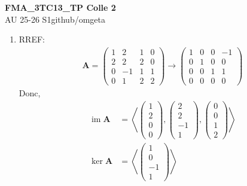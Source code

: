 \documentclass[12pt, a4paper]{article}
\newcommand{\mytitle}{FMA\_3TC13\_TP Colle 2}
\newcommand{\myauthor}{github/omgeta}
\newcommand{\mydate}{AU 25-26 S1}
\newcommand{\im}{\operatorname{im}}
\begin{document}
\raggedright
\footnotesize
\begin{center}
{\normalsize{\textbf{\mytitle}}} \\
{\footnotesize{\mydate\hspace{2pt}\textemdash\hspace{2pt}\myauthor}}
\end{center}
\begin{enumerate}
  \item RREF:
    \begin{align*}
      \mathbf{A} = \left(\begin{array}{cccc} 1 & 2 & 1 & 0\\ 2 & 2 & 2 & 0\\ 0 & -1 & 1 & 1\\ 0 & 1 & 2 & 2 \end{array}\right) \rightarrow \left(\begin{array}{cccc} 1 & 0 & 0 & -1\\ 0 & 1 & 0 & 0\\ 0 & 0 & 1 & 1\\ 0 & 0 & 0 & 0 \end{array}\right)
    \end{align*}
    Donc,
    \begin{align*}
      \im \mathbf{A} &= \left\langle \left( \begin{array}{c} 1\\2\\0\\0\end{array} \right), \left(\begin{array}{c} 2\\2\\-1\\1\end{array} \right), \left(\begin{array}{c} 0\\0\\1\\2\end{array} \right) \right\rangle \\
      \ker \mathbf{A} &= \left\langle \left(\begin{array}{c} 1\\0\\-1\\1 \end{array}\right) \right\rangle 

\end{align*}
\end{enumerate}
\end{document}
